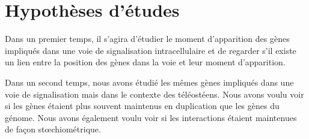 \newpage
\section{Hypothèses d'études}
\par Dans un premier temps, il s'agira d'étudier le moment d'apparition des gènes impliqués dans une voie de signalisation intracellulaire et de regarder s'il existe un lien entre la position des gènes dans la voie et leur moment d'apparition.
\par Dans un second temps, nous avons étudié les mêmes gènes impliqués dans une voie de signalisation mais dans le contexte des téléostéens. Nous avons voulu voir si les gènes étaient plus souvent maintenus en duplication que les gènes du génome. Nous avons également voulu voir si les interactions étaient maintenues de façon stœchiométrique.